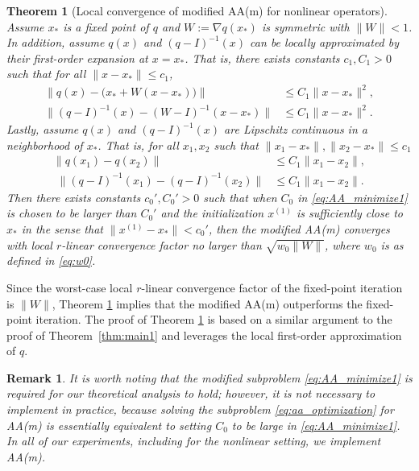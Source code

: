 \documentclass[11pt]{article}
\newtheorem{theorem}{Theorem}%
\newtheorem{remark}{Remark}[section]
\begin{document}
{\color{black}
\begin{theorem}[Local convergence of modified AA(m) for nonlinear operators]\label{thm:main2} Assume $x_*$ is a fixed point of $q$ and $W:=\nabla q(x_*)$ is symmetric with  $\|W\|< 1$. In addition, assume $q(x)$ and $(q-I)^{-1}(x)$ can be locally approximated by their first-order expansion at $x=x_*$. That is, there exists constants $c_1, C_1>0$ such that for all $\|x-x_*\|\leq c_1$, 
\begin{align}\label{eq:assumption_main2}
\big\|q(x)-\big(x_*+ W(x-x_*)\big)\big\|&\leq C_1\|x-x_*\|^2,\\
\big\|(q-I)^{-1}(x)-(W-I)^{-1}(x-x_*)\big\|&\leq C_1\|x-x_*\|^2.\nonumber
\end{align}
Lastly, assume $q(x)$ and $(q-I)^{-1}(x)$ are Lipschitz continuous in a neighborhood of $x_*$. That is, for all $x_1,x_2$ such that $\|x_1-x_*\|,\|x_2-x_*\|\leq c_1$
\begin{align}\label{eq:assumption_main3}
\big\|q(x_1)-q(x_2)\big\|&\leq C_1\|x_1-x_2\|,\\\,\,\big\|(q-I)^{-1}(x_1)-(q-I)^{-1}(x_2)\big\|&\leq C_1\|x_1-x_2\|.\nonumber
\end{align}
Then there exists constants $c_0', C_0'>0$ such that when $C_0$ in \eqref{eq:AA_minimize1} is chosen to be larger than $C_0'$ and the initialization $x^{(1)}$ is sufficiently close to $x_*$ in the sense that $\|x^{(1)}-x_*\|<c_0'$, then the modified AA(m) converges with local $r$-linear convergence factor no larger than $\sqrt{w_0\|W\|}$, where $w_0$ is as defined in \eqref{eq:w0}.%
\end{theorem}
}
Since the {\color{black}worst-case local $r$-linear convergence factor} of the fixed-point iteration is $\|{W}\|$, Theorem \ref{thm:main2} implies that the modified AA(m) outperforms the fixed-point iteration.
The proof of Theorem \ref{thm:main2} is based on a similar argument to the proof of Theorem~\ref{thm:main1} and leverages the local first-order approximation of $q$. 

{\color{black}
\begin{remark}
It is worth noting that the modified subproblem \eqref{eq:AA_minimize1} is required for our theoretical analysis to hold; however, it is not necessary to implement in practice,  because solving the subproblem \eqref{eq:aa_optimization} for AA(m) is essentially equivalent to setting $C_0$ to be large in \eqref{eq:AA_minimize1}. 
In all of our experiments, including for the nonlinear setting, we implement AA(m). 
\end{remark}
}
\end{document}

